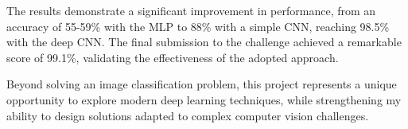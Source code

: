 The results demonstrate a significant improvement in performance, from an accuracy of 55-59\% with the MLP to 88\% with a simple CNN, reaching 98.5\% with the deep CNN. The final submission to the challenge achieved a remarkable score of 99.1\%, validating the effectiveness of the adopted approach.

Beyond solving an image classification problem, this project represents a unique opportunity to explore modern deep learning techniques, while strengthening my ability to design solutions adapted to complex computer vision challenges.
\newpage